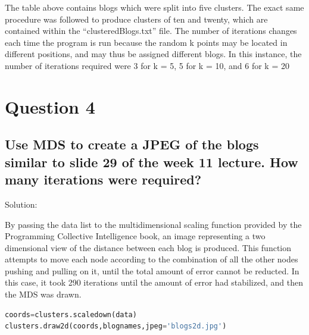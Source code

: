 \documentclass[11pt]{scrartcl} %
\begin{document}
\tabto{2.0cm} The table above contains blogs which were split into five clusters. The exact same procedure was followed to produce clusters of ten and twenty, which are contained within the ``clusteredBlogs.txt'' file. \newline \newline The number of iterations changes each time the program is run because the random k points may be located in different positions, and may thus be assigned different blogs. In this instance, the number of iterations required were 3 for k = 5, 5 for k = 10, and 6 for k = 20 

\pagebreak

\section*{Question 4}


\subsection*{Use MDS to create a JPEG of the blogs similar to slide 29 of the 
week 11 lecture.  How many iterations were required?}

\bigskip\bigskip
\LARGE Solution: \newline\newline\small

\tabto{2.0 cm} By passing the data list to the multidimensional scaling function provided by the Programming Collective Intelligence book, an image representing a two dimensional view of the distance between each blog is produced. This function attempts to move each node according to the combination of all the other nodes pushing and pulling on it, until the total amount of error cannot be reducted. In this case, it took 290 iterations until the amount of error had stabilized, and then the MDS was drawn.


 \begin{lstlisting}[language = Python, caption=Drawing 2d from Programming Collective Intelligence]
coords=clusters.scaledown(data)
clusters.draw2d(coords,blognames,jpeg='blogs2d.jpg')

\end{lstlisting}
\end{document}
